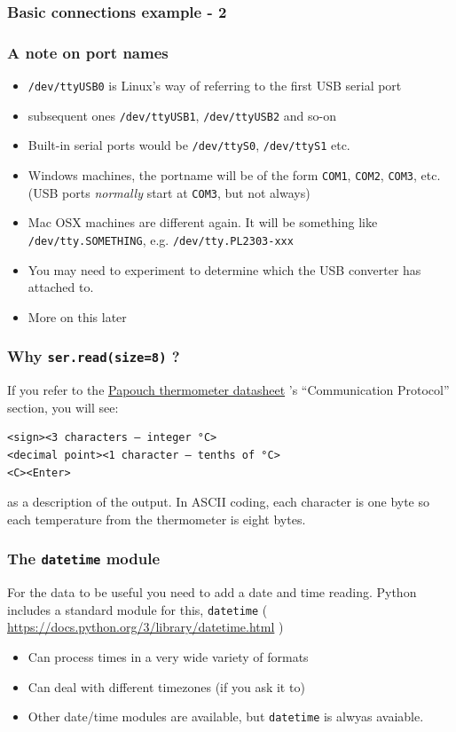 \documentclass[aspectratio=1610,9pt]{beamer} %
\begin{document}
\begin{frame}[fragile]
\frametitle{Basic connections example - 2}

\subsubsection{A note on port names}

\begin{itemize}
\itemsep1pt\parskip0pt
\item
  \texttt{/dev/ttyUSB0} is Linux's way of referring to the first USB
  serial port
\item
  subsequent ones \texttt{/dev/ttyUSB1}, \texttt{/dev/ttyUSB2} and so-on
\item
  Built-in serial ports would be \texttt{/dev/ttyS0},
  \texttt{/dev/ttyS1} etc.
\item
  Windows machines, the portname will be of the form \texttt{COM1},
  \texttt{COM2}, \texttt{COM3}, etc. (USB ports \emph{normally} start at
  \texttt{COM3}, but not always)
\item
  Mac OSX machines are different again. It will be something like
  \texttt{/dev/tty.SOMETHING}, e.g. \texttt{/dev/tty.PL2303-xxx}
\item
  You may need to experiment to determine which the USB converter has
  attached to.
\item
  More on this later
\end{itemize}

\end{frame}
\begin{frame}[fragile]
\frametitle{Why \texttt{ser.read(size=8)} ?}
If you refer to the
\href{http://www.papouch.com/en/shop/product/tm-rs232-thermometer/tm_en.pdf}{Papouch
thermometer datasheet} 's ``Communication Protocol'' section, you will
see:

\begin{verbatim}
<sign><3 characters – integer °C>
<decimal point><1 character – tenths of °C>
<C><Enter>
\end{verbatim}

as a description of the output. In ASCII coding, each character is one
byte so each temperature from the thermometer is eight bytes.

\end{frame}
\begin{frame}
\frametitle{The \texttt{datetime} module}

For the data to be useful you need to add a date and time reading.
Python includes a standard module for this, \texttt{datetime} (
\url{https://docs.python.org/3/library/datetime.html}
)
\begin{itemize}
\item Can process times in a very wide variety of formats
\item Can deal with different timezones (if you ask it to)
\item Other date/time modules are available, but \texttt{datetime} is alwyas avaiable.
\end{itemize}
\end{frame}
\end{document}
